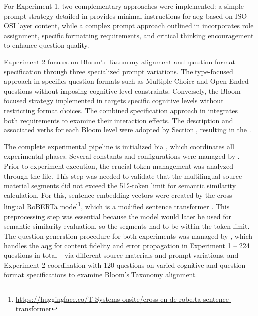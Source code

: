 For Experiment 1, two complementary approaches were implemented: a simple prompt strategy detailed in  provides minimal instructions for \ac{aqg} based on ISO-OSI layer content, while a complex prompt approach outlined in  incorporates role assignment, specific formatting requirements, and critical thinking encouragement to enhance question quality.

\pagebreak

Experiment 2 focuses on Bloom's Taxonomy alignment and question format specification through three specialized prompt variations. The type-focused approach in  specifies question formats such as Multiple-Choice and Open-Ended questions without imposing cognitive level constraints. Conversely, the Bloom-focused strategy implemented in  targets specific cognitive levels without restricting format choices. The combined specification approach in  integrates both requirements to examine their interaction effects. The description and associated verbs for each Bloom level were adopted by Section , resulting in the .

The complete experimental pipeline is initialized bia , which coordinates all experimental phases. Several constants and configurations were managed by . Prior to experiment execution, the crucial token management was analyzed through the  file. This step was needed to validate that the multilingual source material segments did not exceed the 512-token limit for semantic similarity calculation. For this, sentence embedding vectors were created by the cross-lingual RoBERTa model\footnote{\url{https://huggingface.co/T-Systems-onsite/cross-en-de-roberta-sentence-transformer}}, which is a modified sentence transformer \cite{reimers_sentence-bert_2019}. This preprocessing step was essential because the model would later be used for semantic similarity evaluation, so the segments had to be within the token limit.
The question generation procedure for both experiments was managed by , which handles the \ac{aqg} for content fidelity and error propagation in Experiment 1 -- 224 questions in total -- via different source materials and prompt variations, and Experiment 2 coordination with 120 questions on varied cognitive and question format specifications to examine Bloom's Taxonomy alignment.

